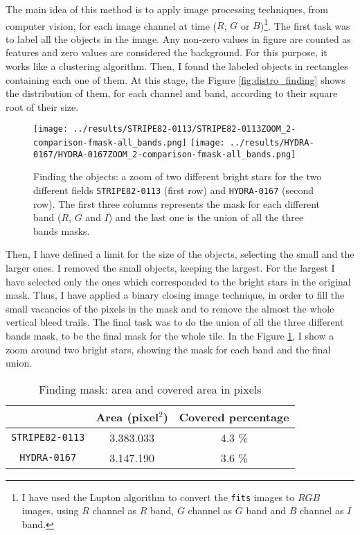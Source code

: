 \documentclass{article}
\begin{document}
The main idea of this method is to apply image processing techniques, from computer vision, for each image channel at time ($R$, $G$ or $B$)\footnote{I have used the Lupton algorithm \cite{Lupton2003} to convert the \texttt{fits} images to $RGB$ images, using $R$ channel as $R$ band, $G$ channel as $G$ band and $B$ channel as $I$ band.}. The first task was to label all the objects in the image.  Any non-zero values in figure are counted as features and zero values are considered the background. For this purpose, it works like a clustering algorithm. Then, I found the labeled objects in rectangles containing each one of them. At this stage, the Figure \ref{fig:distro_finding} shows the distribution of them, for each channel and band, according to their square root of their size.

\begin{figure}[h!]
  \centering
  \texttt{[image: ../results/STRIPE82-0113/STRIPE82-0113ZOOM\_2-comparison-fmask-all\_bands.png]}
  \texttt{[image: ../results/HYDRA-0167/HYDRA-0167ZOOM\_2-comparison-fmask-all\_bands.png]}
  \caption{Finding the objects: a zoom of two different bright stars for the two different fields \texttt{STRIPE82-0113} (first row) and \texttt{HYDRA-0167} (second row). The first three columns represents the mask for each different band ($R$, $G$ and $I$) and the last one is the union of all the three bands masks.}
  \label{fig:zoom_mask_finding}
\end{figure}


Then, I have defined a limit for the size of the objects, selecting the small and the larger ones. I removed the small objects, keeping the largest. For the largest I have selected only the ones which corresponded to the bright stars in the original mask. Thus, I have applied a binary closing image technique, in order to fill the small vacancies of the pixels in the mask and to remove the almost the whole vertical bleed trails. The final task was to do the union of all the three different bands mask, to be the final mask for the whole tile. In the Figure \ref{fig:zoom_mask_finding}, I show a zoom around two bright stars, showing the mask for each band and the final union.

\begin{table}[h!]
  \centering
  \caption{Finding mask: area and covered area in pixels}
  \begin{tabular}{c|c|c}
    \cline{2-3}
     & {\cellcolor{orange!20}\bf Area (pixel$^2$)} & {\cellcolor{orange!20}\bf Covered percentage} \\
    \hline
    {\cellcolor{blue!20}\texttt{STRIPE82-0113}} & 3.383.033 & 4.3 \%\\
    \hline
    {\cellcolor{blue!20}\texttt{HYDRA-0167}} & 3.147.190 & 3.6 \%\\
    \hline
  \end{tabular}
  \label{tb:finding_masks}
\end{table}
\end{document}
